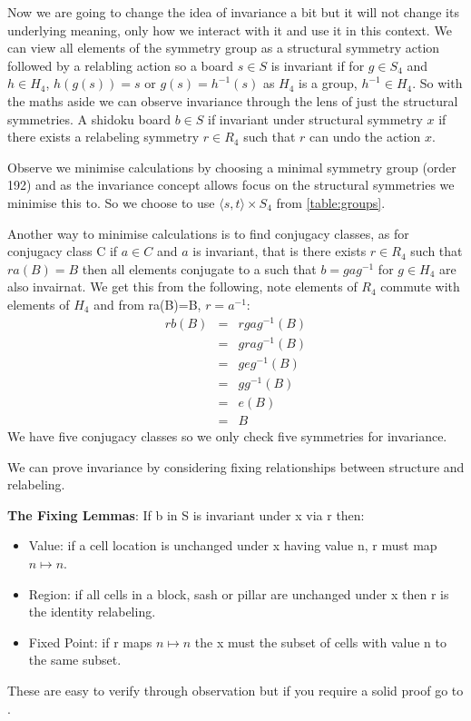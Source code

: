 \documentclass[a4paper,11pt]{report}
\begin{document}
{Now we are going to change the idea of invariance a bit but it will not change its underlying meaning, only how we interact with it and use it in this context. We can view all elements of the symmetry group as a structural symmetry action followed by a relabling action so a board $s\in S$ is invariant if for $g\in S_4$ and $h\in H_4$, $h(g(s))=s$ or $g(s)=h^{-1}(s)$ as $H_4 $ is a group, $h^{-1}\in H_4$. So with the maths aside we can observe invariance through the lens of just the structural symmetries. A shidoku board $b\in S$ if invariant under structural symmetry $x$ if there exists a  relabeling symmetry $r\in R_4$ such that $r$ can undo the action $x$.

Observe we minimise calculations by choosing a minimal symmetry group (order 192) and as the invariance concept allows focus on the structural symmetries we minimise this to. So we choose to use $\langle s,t \rangle \times S_4$ from \ref{table:groups}.

Another way to minimise calculations is to find conjugacy classes, as for conjugacy class C if $a\in C$ and $a$ is invariant, that is there exists $r\in R_4$ such that$ra(B)=B$ then all elements conjugate to a such that $b=gag^{-1}$ for $g\in H_4$ are also invairnat. We get this from the following, note elements of $R_4$ commute with elements of $H_4$ and from ra(B)=B, $r=a^{-1}$:
\begin{eqnarray}
rb(B)&=&rgag^{-1}(B)\\
&=&grag^{-1}(B)\\
&=&geg^{-1}(B)\\
&=&gg^{-1}(B)\\
&=&e(B)\\
&=&B
\end{eqnarray}
We have five conjugacy classes so we only check five symmetries for invariance. 

We can prove invariance by considering fixing relationships between structure and relabeling. 

\textbf{The Fixing Lemmas}: If b in S is invariant under x via r then:
\begin{itemize}
\item Value: if a cell location is unchanged under x having value n, r must map $n \mapsto n$.
\item Region: if all cells in a block, sash or pillar are unchanged under x then r is the identity relabeling. 
\item Fixed Point: if r maps $n\mapsto n$ the x must the subset of cells with value n to the same subset.
\end{itemize}
These are easy to verify through observation but if you require a solid proof go to \cite{minimal complete shidoku symmetry groups pg 10}.

}
\end{document}
